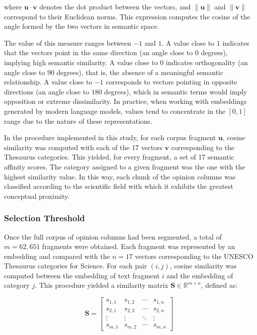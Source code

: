 \documentclass[pdflatex,sn-mathphys-num, iicol]{sn-jnl}
\begin{document}
	
	where $\mathbf{u} \cdot \mathbf{v}$ denotes the dot product between the vectors, and $\lVert \mathbf{u} \rVert$ and $\lVert \mathbf{v} \rVert$ correspond to their Euclidean norms. This expression computes the cosine of the angle formed by the two vectors in semantic space.
	
	The value of this measure ranges between $-1$ and $1$. A value close to $1$ indicates that the vectors point in the same direction (an angle close to $0$ degrees), implying high semantic similarity. A value close to $0$ indicates orthogonality (an angle close to $90$ degrees), that is, the absence of a meaningful semantic relationship. A value close to $-1$ corresponds to vectors pointing in opposite directions (an angle close to $180$ degrees), which in semantic terms would imply opposition or extreme dissimilarity. In practice, when working with embeddings generated by modern language models, values tend to concentrate in the $[0,1]$ range due to the nature of these representations.
	
	In the procedure implemented in this study, for each corpus fragment $\mathbf{u}$, cosine similarity was computed with each of the 17 vectors $\mathbf{v}$ corresponding to the Thesaurus categories. This yielded, for every fragment, a set of 17 semantic affinity scores. The category assigned to a given fragment was the one with the highest similarity value. In this way, each chunk of the opinion columns was classified according to the scientific field with which it exhibits the greatest conceptual proximity.
	 
	
	\subsubsection{Selection Threshold}\label{subsubsec:threshold}
	
	Once the full corpus of opinion columns had been segmented, a total of $m = 62{,}651$ fragments were obtained. Each fragment was represented by an embedding and compared with the $n = 17$ vectors corresponding to the UNESCO Thesaurus categories for Science. For each pair $(i,j)$, cosine similarity was computed between the embedding of text fragment $i$ and the embedding of category $j$. This procedure yielded a similarity matrix $\mathbf{S} \in \mathbb{R}^{m \times n}$, defined as:
	
	
	\begin{equation}
		\mathbf{S} =
		\begin{bmatrix}
			s_{1,1} & s_{1,2} & \cdots & s_{1,n} \\
			s_{2,1} & s_{2,2} & \cdots & s_{2,n} \\
			\vdots  & \vdots  & \ddots & \vdots  \\
			s_{m,1} & s_{m,2} & \cdots & s_{m,n}
		\end{bmatrix}
		\label{eq:matrix}
	\end{equation}
	
\end{document}
